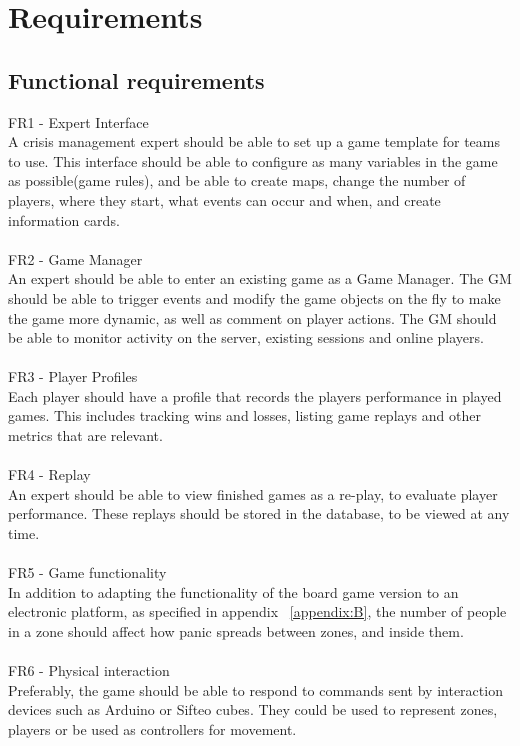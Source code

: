 \chapter{Requirements}
\section{Functional requirements}


FR1 - Expert Interface\\
A crisis management expert should be able to set up a game template for teams to use. This interface should be able to configure as many variables in the game as possible(game rules), and be able to create maps, change the number of players, where they start, what events can occur and when, and create information cards.\\
\\
FR2 - Game Manager\\
An expert should be able to enter an existing game as a Game Manager. The GM should be able to trigger events and modify the game objects on the fly to make the game more dynamic, as well as comment on player actions. The GM should be able to monitor activity on the server, existing sessions and online players.\\
\\
FR3 - Player Profiles\\
Each player should have a profile that records the players performance in played games. This includes tracking wins and losses, listing game replays and other metrics that are relevant.\\
\\
FR4 - Replay\\
An expert should be able to view finished games as a re-play, to evaluate player performance. These replays should be stored in the database, to be viewed at any time.\\
\\
FR5 - Game functionality\\
In addition to adapting the functionality of the board game version to an electronic platform, as specified in appendix ~\ref{appendix:B}, the number of people in a zone should affect how panic spreads between zones, and inside them. \\
\\
FR6 - Physical interaction\\
Preferably, the game should be able to respond to commands sent by interaction devices such as Arduino or Sifteo cubes. They could be used to represent zones, players or be used as controllers for movement.\\
\\


